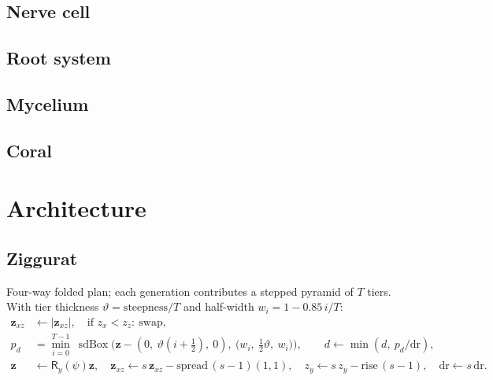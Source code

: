 \documentclass[10pt,a4paper]{article}
\newcommand{\vv}[1]{\mathbf{#1}}
\newcommand{\abs}[1]{\left|#1\right|}
\newcommand{\sdbox}{\operatorname{sdBox}}
\newcommand{\Rot}{\mathsf{R}}
\begin{document}
\subsection{Nerve cell}
\subsection{Root system}
\subsection{Mycelium}
\subsection{Coral}

\section{Architecture}

\subsection{Ziggurat}
Four-way folded plan; each generation contributes a stepped pyramid of $T$ tiers. With tier thickness $\vartheta=\text{steepness}/T$ and half-width $w_i=1-0.85\,i/T$:
\begin{align}
\vv z_{xz}&\leftarrow\abs{\vv z_{xz}},\quad\text{if }z_x<z_z:\ \text{swap},\\
p_d&=\min_{i=0}^{T-1}\ \sdbox\!\Big(\vv z-(0,\ \vartheta(i+\tfrac12),\ 0),\ \big(w_i,\ \tfrac12\vartheta,\ w_i\big)\Big),\qquad d\leftarrow\min(d,\ p_d/\mathrm{dr}),\\
\vv z&\leftarrow\Rot_y(\psi)\vv z,\quad \vv z_{xz}\leftarrow s\,\vv z_{xz}-\mathrm{spread}\,(s-1)(1,1),\quad z_y\leftarrow s\,z_y-\mathrm{rise}\,(s-1),\quad\mathrm{dr}\leftarrow s\,\mathrm{dr}.
\end{align}

\end{document}
